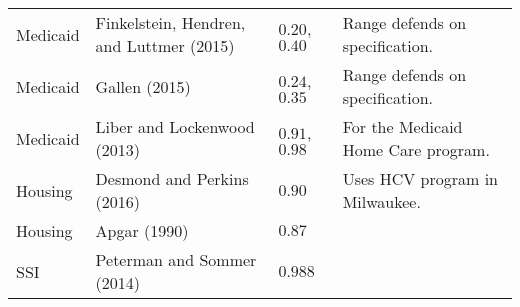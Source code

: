 \documentclass{article}
\begin{document}
\begin{sidewaystable}
\begin{tabularx}{\textwidth}{l X l X}
Medicaid			&
Finkelstein, Hendren, and Luttmer (2015)		&
$0.20$, $0.40$ 				&
Range defends on specification. \\

Medicaid			&
Gallen (2015)		&
$0.24$, $0.35$ 				&
Range defends on specification. \\

Medicaid			&
Liber and Lockenwood (2013)		&
$0.91$, $0.98$ 				&
For the Medicaid Home Care program. \\

Housing				&
Desmond and Perkins (2016)		&
$0.90$				&
Uses HCV program in Milwaukee. \\

Housing				&
Apgar (1990)		&
$0.87$				&
\\

SSI				&
Peterman and Sommer (2014)		&
$0.988$				&
\\

\bottomrule
\end{tabularx}
\end{sidewaystable}
\end{document}
